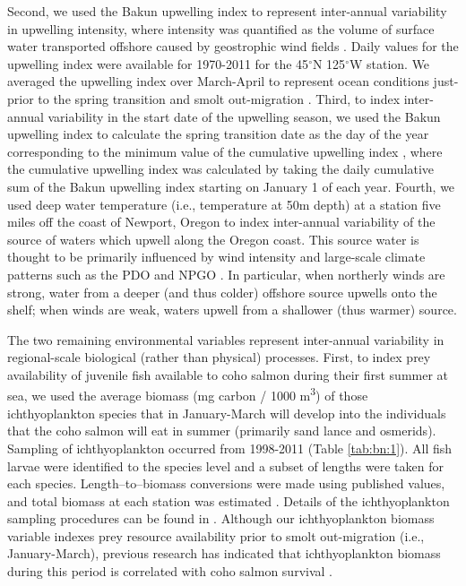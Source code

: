Second, we used the Bakun upwelling index to represent inter-annual variability
in upwelling intensity, where intensity was quantified as the volume of surface
water transported offshore caused by geostrophic wind fields \citep{Bakun1973,
Schwing1996}. Daily values for the upwelling index were available for 1970-2011
for the 45$^{\circ}$N 125$^{\circ}$W station.  We averaged the upwelling index over March-April to
represent ocean conditions just-prior to the spring transition and smolt
out-migration \citep{Logerwell2003a, Lawson1997}. Third, to index inter-annual
variability in the start date of the upwelling season, we used the Bakun
upwelling index to calculate the spring transition date as the day of the year
corresponding to the minimum value of the cumulative upwelling index
\citep{Bakun1973, Bograd2009}, where the cumulative upwelling index was
calculated by taking the daily cumulative sum of the Bakun upwelling index
starting on January 1 of each year. Fourth, we used deep water temperature
(i.e., temperature at 50m depth) at a station five miles off the coast of
Newport, Oregon to index inter-annual variability of the source of waters which
upwell along the Oregon coast. This source water is thought to be primarily
influenced by wind intensity and large-scale climate patterns such as the PDO
and NPGO \citep{Jacox2014, Chhak2007}. In particular, when northerly winds are
strong, water from a deeper (and thus colder) offshore source upwells onto the
shelf; when winds are weak, waters upwell from a shallower (thus warmer) source.

The two remaining environmental variables represent inter-annual variability in
regional-scale biological (rather than physical) processes. First, to index prey
availability of juvenile fish available to coho salmon during their first summer
at sea, we used the average biomass (mg carbon / 1000 m\textsuperscript{3}) of
those ichthyoplankton species that in January-March will develop into the
individuals that the coho salmon will eat in summer (primarily sand lance and
osmerids).  Sampling of ichthyoplankton occurred from 1998-2011 (Table \ref{tab:bn:1}). All
fish larvae were identified to the species level and a subset of lengths were
taken for each species. Length--to--biomass conversions were made using
published values, and total biomass at each station was estimated
\citep{Peterson2012a}. Details of the ichthyoplankton sampling procedures can be
found in \citet{Daly2013}. Although our ichthyoplankton biomass variable indexes
prey resource availability prior to smolt out-migration (i.e., January-March),
previous research has indicated that ichthyoplankton biomass during this period
is correlated with coho salmon survival \citep{Daly2013}.

